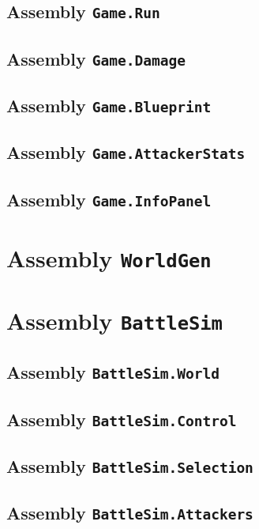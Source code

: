 \subsection{Assembly \texttt{Game.Run}}

\subsection{Assembly \texttt{Game.Damage}}

\subsection{Assembly \texttt{Game.Blueprint}}

\subsection{Assembly \texttt{Game.AttackerStats}}

\subsection{Assembly \texttt{Game.InfoPanel}}

\section{Assembly \texttt{WorldGen}}

\section{Assembly \texttt{BattleSim}}

\subsection{Assembly \texttt{BattleSim.World}}

\subsection{Assembly \texttt{BattleSim.Control}}

\subsection{Assembly \texttt{BattleSim.Selection}}

\subsection{Assembly \texttt{BattleSim.Attackers}}

